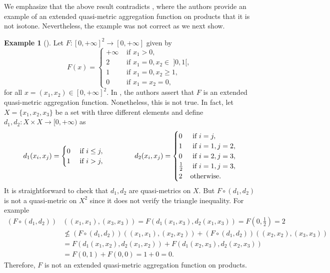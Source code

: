 \documentclass[11pt,a4paper]{amsart}
\theoremstyle{definition}
\newtheorem{example}[theorem]{Example}
\begin{document}
	
	We emphasize that the above result contradicts \cite[Example 3]{MassaVale13}, where the authors provide an example of an extended quasi-metric aggregation function on products that it is not isotone. Nevertheless, the example was not correct as we next show.
	
	\begin{example}[\mbox{\cite[Example 3]{MassaVale13}}]
		Let $F:[0,+\infty]^2\to [0,+\infty]$ given by
		$$F(x)=\begin{cases}
			+\infty&\text{ if }x_1>0,\\
			2&\text{ if }x_1=0,x_2\in\;]0,1[,\\
			1&\text{ if }x_1=0,x_2\geq 1,\\
			0&\text{ if }x_1=x_2=0,
		\end{cases}$$
		for all $x=(x_1,x_2)\in [0,+\infty]^2.$ In \cite[Example 3]{MassaVale13}, the authors assert that $F$ is an extended quasi-metric aggregation function. Nonetheless, this is not true. In fact, let $X=\{x_1,x_2,x_3\}$ be a set with three different elements and define $d_1,d_2:X\times X\to [0,+\infty)$ as
		$$d_1(x_i,x_j)=\begin{cases}
			0&\text{ if }i\leq j,\\
			1&\text{ if }i>j,
		\end{cases}\hspace*{1.5cm}
		d_2(x_i,x_j)=\begin{cases}
			0&\text{ if }i=j,\\
			1&\text{ if }i=1,j=2,\\
			0&\text{ if }i=2,j=3,\\
			\frac{1}{2}&\text{ if }i=1,j=3,\\
			2&\text{otherwise.}
		\end{cases}$$
		It is straightforward to check that $d_1,d_2$ are quasi-metrics on $X.$ But $F\circ (d_1,d_2)$ is not a quasi-metric on $X^2$ since it does not verify the triangle inequality. For example
		\begin{align*}
			(F\circ (d_1,d_2))&((x_1,x_1),(x_3,x_3))=F(d_1(x_1,x_3),d_2(x_1,x_3))=F(0,\tfrac{1}{2})=2\\
			&\not\leq (F\circ (d_1,d_2))((x_1,x_1),(x_2,x_2))+(F\circ (d_1,d_2))((x_2,x_2),(x_3,x_3))\\
			&=F(d_1(x_1,x_2),d_2(x_1,x_2))+F(d_1(x_2,x_3),d_2(x_2,x_3))\\
			&=F(0,1)+F(0,0)=1+0=0.
		\end{align*}
		Therefore, $F$ is not an extended quasi-metric aggregation function on products.
	\end{example}
	
\end{document}
